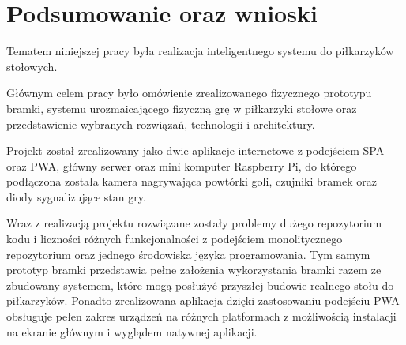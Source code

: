 \chapter{Podsumowanie oraz wnioski}
\label{ch:funplenop}

Tematem niniejszej pracy była realizacja inteligentnego systemu do piłkarzyków stołowych.

Głównym celem pracy było omówienie zrealizowanego fizycznego prototypu bramki, systemu urozmaicającego fizyczną grę w piłkarzyki stołowe oraz przedstawienie wybranych rozwiązań, technologii i architektury.

Projekt został zrealizowany jako dwie aplikacje internetowe z podejściem SPA oraz PWA, główny serwer oraz mini komputer Raspberry Pi, do którego podłączona została kamera nagrywająca powtórki goli, czujniki bramek oraz diody sygnalizujące stan gry.

Wraz z realizacją projektu rozwiązane zostały problemy dużego repozytorium kodu i liczności różnych funkcjonalności z podejściem monolitycznego repozytorium oraz jednego środowiska języka programowania. Tym samym prototyp bramki przedstawia pełne założenia wykorzystania bramki razem ze zbudowany systemem, które mogą posłużyć przyszłej budowie realnego stołu do piłkarzyków. Ponadto zrealizowana aplikacja dzięki zastosowaniu podejściu PWA obsługuje pełen zakres urządzeń na różnych platformach z możliwością instalacji na ekranie głównym i wyglądem natywnej aplikacji.
